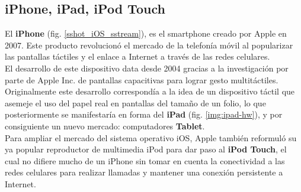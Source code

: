 	

		\subsection{iPhone, iPad, iPod Touch}
		\label{anexo:ios-device}		
El \textbf{iPhone} (fig. \ref{sshot_iOS_sstream}), es el smartphone creado por Apple en 2007. Este producto revolucionó el mercado de la telefonía móvil al popularizar las pantallas táctiles y el enlace a Internet a través de las redes celulares. \\
El desarrollo de este dispositivo data desde 2004 gracias a la investigación por parte de Apple Inc. de pantallas capacitivas para lograr gesto multitáctiles. Originalmente este desarrollo correspondía a la idea de un dispositivo táctil que asemeje el uso del papel real en pantallas del tamaño de un folio, lo que posteriormente se manifestaría en forma del \textbf{iPad} (fig. \ref{img:ipad-hw}), y por consiguiente un nuevo mercado: computadores \textbf{Tablet}.\\

Para ampliar el mercado del sistema operativo iOS, Apple también reformuló su ya popular reproductor de multimedia iPod para dar paso al \textbf{iPod Touch}, el cual no difiere mucho de un iPhone sin tomar en cuenta la conectividad a las redes celulares para realizar llamadas y mantener una conexión persistente a Internet.\\

